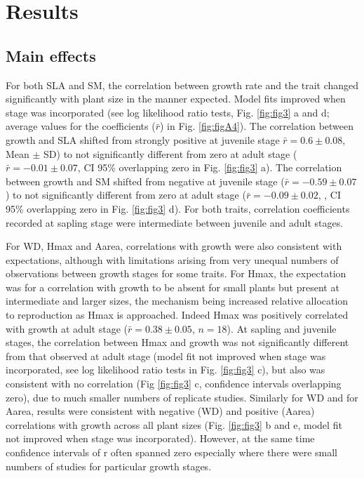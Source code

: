 \documentclass[a4paper,11pt]{article}
\begin{document}
\section*{Results}\label{results}

\subsection*{Main effects}

For both SLA and SM, the correlation between growth rate and the trait changed significantly with plant size in the manner expected. Model fits improved when stage was incorporated (see log likelihood ratio tests, Fig. \ref{fig:fig3} a and d; average values for the coefficients ($\bar{r}$) in Fig. \ref{fig:figA4}). The correlation between growth and SLA shifted from strongly positive at juvenile stage $\bar{r}=0.6 \pm 0.08$, Mean $\pm$ SD) to not significantly different from zero at adult stage ($\bar{r}= -0.01 \pm 0.07$, CI 95\% overlapping zero in Fig. \ref{fig:fig3} a). The correlation between growth and SM shifted from negative at juvenile stage ($\bar{r}= -0.59 \pm 0.07$) to not significantly different from zero at adult stage ($\bar{r}= -0.09 \pm 0.02$, , CI 95\% overlapping zero in Fig. \ref{fig:fig3} d). For both traits, correlation coefficients recorded at sapling stage were intermediate between juvenile and adult stages.

For WD, Hmax and Aarea, correlations with growth were also consistent with expectations, although with limitations arising from very unequal numbers of observations between growth stages for some traits. For Hmax, the expectation was for a correlation with growth to be absent for small plants but present at intermediate and larger sizes, the mechanism being increased relative allocation to reproduction as Hmax is approached. Indeed Hmax was positively correlated with growth at adult stage ($\bar{r}= 0.38 \pm 0.05$, $n=18$). At sapling and juvenile stages, the correlation between Hmax and growth was not significantly different from that observed at adult stage (model fit not improved when stage was incorporated, see log likelihood ratio tests in Fig. \ref{fig:fig3} c), but also was consistent with no correlation (Fig \ref{fig:fig3} c, confidence intervals overlapping zero), due to much smaller numbers of replicate studies. Similarly for WD and for Aarea, results were consistent with negative (WD) and positive (Aarea) correlations with growth across all plant sizes (Fig. \ref{fig:fig3} b and e, model fit not improved when stage was incorporated). However, at the same time confidence intervals of r often spanned zero especially where there were small numbers of studies for particular growth stages.
\end{document}
